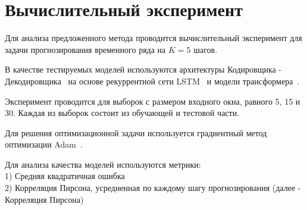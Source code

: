 \newpage

\section{Вычислительный эксперимент}

Для анализа предложенного метода проводится вычислительный эксперимент для задачи прогнозирования временного ряда на $K=5$ шагов. 

В качестве тестируемых моделей используются архитектуры Кодировщика - Декодировщика~\cite{EncoderDecoder} на основе рекуррентной сети LSTM~\cite{LSTM1, LSTM2} и модели трансформера~\cite{Attention is all you need}.

Эксперимент проводится для выборок с размером входного окна, равного 5, 15 и 30. Каждая из выборок состоит из обучающей и тестовой части.


\begin{table}[H]
\begin{center}
\caption{Выборки}
\label{datasets}
\end{center}
\end{table}

Для решения оптимизационной задачи используется градиентный метод оптимизации Adam~\cite{Adam}.

Для анализа качества моделей используются метрики: \\
1) Средняя квадратичная ошибка \\
2) Корреляция Пирсона, усредненная по каждому шагу прогнозирования (далее - Корреляция Пирсона)

\newpage

